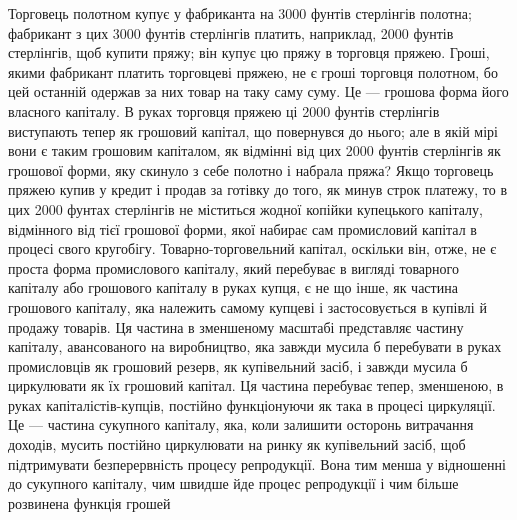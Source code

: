 Торговець полотном купує у фабриканта на 3000 фунтів
стерлінгів полотна; фабрикант з цих 3000 фунтів стерлінгів платить,
наприклад, 2000 фунтів стерлінгів, щоб купити пряжу;
він купує цю пряжу в торговця пряжею. Гроші, якими фабрикант
платить торговцеві пряжею, не є гроші торговця полотном,
бо цей останній одержав за них товар на таку саму суму. Це —
грошова форма його власного капіталу. В руках торговця пряжею
ці 2000 фунтів стерлінгів виступають тепер як грошовий
капітал, що повернувся до нього; але в якій мірі вони є таким
грошовим капіталом, як відмінні від цих 2000 фунтів стерлінгів
як грошової форми, яку скинуло з себе полотно і набрала
пряжа? Якщо торговець пряжею купив у кредит і продав за
готівку до того, як минув строк платежу, то в цих 2000 фунтах
стерлінгів не міститься жодної копійки купецького капіталу,
відмінного від тієї грошової форми, якої набирає сам промисловий
капітал в процесі свого кругобігу. Товарно-торговельний
капітал, оскільки він, отже, не є проста форма промислового
капіталу, який перебуває в вигляді товарного капіталу або грошового
капіталу в руках купця, є не що інше, як частина грошового
капіталу, яка належить самому купцеві і застосовується
в купівлі й продажу товарів. Ця частина в зменшеному масштабі
представляє частину капіталу, авансованого на виробництво,
яка завжди мусила б перебувати в руках промисловців
як грошовий резерв, як купівельний засіб, і завжди мусила б
циркулювати як їх грошовий капітал. Ця частина перебуває тепер,
зменшеною, в руках капіталістів-купців, постійно функціонуючи
як така в процесі циркуляції. Це — частина сукупного
капіталу, яка, коли залишити осторонь витрачання доходів,
мусить постійно циркулювати на ринку як купівельний засіб,
щоб підтримувати безперервність процесу репродукції. Вона
тим менша у відношенні до сукупного капіталу, чим швидше
йде процес репродукції і чим більше розвинена функція грошей
